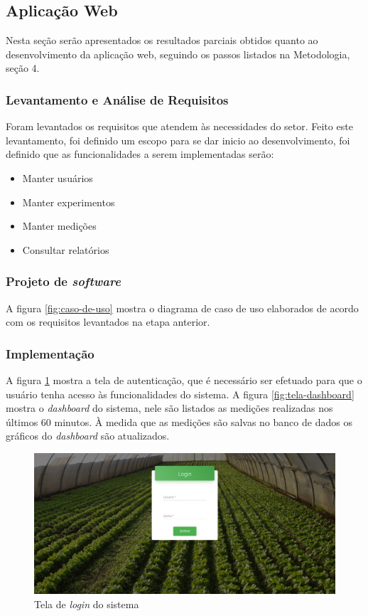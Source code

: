\subsection{Aplicação Web}
Nesta seção serão apresentados os resultados parciais obtidos quanto ao desenvolvimento da aplicação web, seguindo os passos listados na Metodologia, seção 4.

\subsubsection{Levantamento e Análise de Requisitos}
Foram levantados os requisitos que atendem às necessidades do setor. Feito este levantamento, foi definido um escopo para se dar inicio ao desenvolvimento, foi definido que as funcionalidades a serem implementadas serão: 

\begin{itemize}[itemsep=0em]
\item Manter usuários
\item Manter experimentos
\item Manter medições
\item Consultar relatórios
\end{itemize}

\subsubsection{Projeto de \textit{software}}
A figura \ref{fig:caso-de-uso} mostra o diagrama de caso de uso elaborados de acordo com os requisitos levantados na etapa anterior.

\subsubsection{Implementação}
A figura \ref{fig:tela-login} mostra a tela de autenticação, que é necessário ser efetuado para que o usuário tenha acesso às funcionalidades do sistema. A figura \ref{fig:tela-dashboard} mostra o \textit{dashboard} do sistema, nele são listados as medições realizadas nos últimos 60 minutos. À medida que as medições são salvas no banco de dados os gráficos do \textit{dashboard} são atualizados.

\begin{figure}[H]
    \centering
    \includegraphics[scale=0.3]{04-figuras/tela_login.jpg}
    \caption{Tela de \textit{login} do sistema}
    \vspace{-\baselineskip}
    \label{fig:tela-login}
\end{figure}

